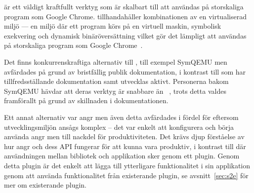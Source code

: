 \stoe{} är ett väldigt kraftfullt verktyg som är skalbart till att användas på
storskaliga program som Google Chrome. \stoe{} tillhandahåller
kombinationen av en virtualiserad miljö — en miljö där ett program körs på en
virtuell maskin, symbolisk exekvering och dynamisk binäröversättning vilket gör
det lämpligt att användas på storskaliga program som Google Chrome~\cite{s2e}.

Det finns konkurrenskraftiga alternativ till \stoe{}, till exempel SymQEMU men
avfärdades på grund av bristfällig publik dokumentation, i kontrast till \stoe{}
som har tillfredsställande dokumentation samt utvecklas aktivt. Personerna bakom
SymQEMU hävdar att deras verktyg är snabbare än \stoe{}~\cite{symqemu}, trots detta valdes \stoe{}
framförallt på grund av skillnaden i dokumentationen.

Ett annat alternativ var angr men även detta avfärdades i fördel för \stoe{}
eftersom utvecklingsmiljön ansågs komplex – det var enkelt att konfigurera och börja
använda angr men till nackdel för produktiviteten. Det krävs djup förståelse av
hur angr och dess API fungerar för att kunna vara produktiv, i kontrast till
\stoe{} där användningen mellan bibliotek och applikation sker genom ett plugin.
Genom detta plugin är det enkelt att lägga till ytterligare funktionalitet i sin
applikation genom att använda funktionalitet från existerande plugin, se
avsnitt~\ref{sec:s2e} för mer om existerande plugin. 

